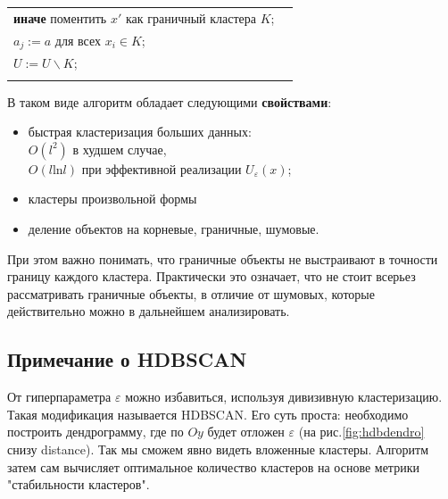 \begin{tabularx}{\linewidth}{lX}
    \hspace*{7mm}\hspace*{7mm}\hspace*{7mm} \textbf{иначе} поментить $x'$ как граничный кластера $K$;                                               \\
    \hspace*{7mm}\hspace*{7mm} $a_j := a$ для всех $x_i \in K$;                                                                                     \\
    \hspace*{7mm}\hspace*{7mm} $U := U \backslash K$;                                                                                               \\
    \vspace{5mm}
\end{tabularx}

В таком виде алгоритм обладает следующими \textbf{свойствами}:
\begin{itemize}
    \item быстрая кластеризация больших данных: \\$O(l^2)$ в худшем случае, \\ $O(l \mathrm{ln} l)$ при эффективной реализации $U_\varepsilon (x)$;
    \item кластеры произвольной формы
    \item деление объектов на корневые, граничные, шумовые.
\end{itemize}

При этом важно понимать, что граничные объекты не выстраивают в точности границу каждого кластера. Практически это означает, что не стоит всерьез рассматривать граничные объекты, в отличие от шумовых, которые действительно можно в дальнейшем анализировать.

\subsection{Примечание о HDBSCAN}
От гиперпараметра $\varepsilon$ можно избавиться, используя дивизивную кластеризацию. Такая модификация называется HDBSCAN. Его суть проста: необходимо построить дендрограмму, где по $Oy$ будет отложен $\varepsilon$ (на рис.\ref{fig:hdbdendro} снизу distance). Так мы сможем явно видеть вложенные кластеры. Алгоритм затем сам вычисляет оптимальное количество кластеров на основе метрики "стабильности кластеров".

